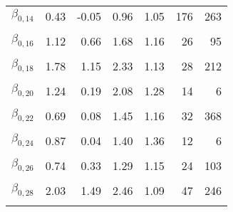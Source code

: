 \begin{table}
\begin{tabular}[t]{lrrrrrr}
$\beta_{0, 14}$ & 0.43 & -0.05 & 0.96 & 1.05 & 176 & 263\\
\cellcolor{gray!6}{$\beta_{0, 15}$} & \cellcolor{gray!6}{3.00} & \cellcolor{gray!6}{2.24} & \cellcolor{gray!6}{3.78} & \cellcolor{gray!6}{1.07} & \cellcolor{gray!6}{137} & \cellcolor{gray!6}{167}\\
$\beta_{0, 16}$ & 1.12 & 0.66 & 1.68 & 1.16 & 26 & 95\\
\cellcolor{gray!6}{$\beta_{0, 17}$} & \cellcolor{gray!6}{0.58} & \cellcolor{gray!6}{0.17} & \cellcolor{gray!6}{1.04} & \cellcolor{gray!6}{1.09} & \cellcolor{gray!6}{87} & \cellcolor{gray!6}{214}\\
$\beta_{0, 18}$ & 1.78 & 1.15 & 2.33 & 1.13 & 28 & 212\\
\cellcolor{gray!6}{$\beta_{0, 19}$} & \cellcolor{gray!6}{1.15} & \cellcolor{gray!6}{0.55} & \cellcolor{gray!6}{1.64} & \cellcolor{gray!6}{1.15} & \cellcolor{gray!6}{32} & \cellcolor{gray!6}{10}\\
$\beta_{0, 20}$ & 1.24 & 0.19 & 2.08 & 1.28 & 14 & 6\\
\cellcolor{gray!6}{$\beta_{0, 21}$} & \cellcolor{gray!6}{1.99} & \cellcolor{gray!6}{1.28} & \cellcolor{gray!6}{2.45} & \cellcolor{gray!6}{1.34} & \cellcolor{gray!6}{14} & \cellcolor{gray!6}{22}\\
$\beta_{0, 22}$ & 0.69 & 0.08 & 1.45 & 1.16 & 32 & 368\\
\cellcolor{gray!6}{$\beta_{0, 23}$} & \cellcolor{gray!6}{0.98} & \cellcolor{gray!6}{0.41} & \cellcolor{gray!6}{1.61} & \cellcolor{gray!6}{1.27} & \cellcolor{gray!6}{14} & \cellcolor{gray!6}{191}\\
$\beta_{0, 24}$ & 0.87 & 0.04 & 1.40 & 1.36 & 12 & 6\\
\cellcolor{gray!6}{$\beta_{0, 25}$} & \cellcolor{gray!6}{0.45} & \cellcolor{gray!6}{-0.15} & \cellcolor{gray!6}{1.10} & \cellcolor{gray!6}{1.20} & \cellcolor{gray!6}{19} & \cellcolor{gray!6}{88}\\
$\beta_{0, 26}$ & 0.74 & 0.33 & 1.29 & 1.15 & 24 & 103\\
\cellcolor{gray!6}{$\beta_{0, 27}$} & \cellcolor{gray!6}{1.08} & \cellcolor{gray!6}{0.31} & \cellcolor{gray!6}{1.60} & \cellcolor{gray!6}{1.20} & \cellcolor{gray!6}{19} & \cellcolor{gray!6}{7}\\
$\beta_{0, 28}$ & 2.03 & 1.49 & 2.46 & 1.09 & 47 & 246\\
\cellcolor{gray!6}{$\beta_{0, 29}$} & \cellcolor{gray!6}{1.31} & \cellcolor{gray!6}{0.73} & \cellcolor{gray!6}{1.92} & \cellcolor{gray!6}{1.12} & \cellcolor{gray!6}{69} & \cellcolor{gray!6}{247}\\

\end{tabular}
\end{table}
